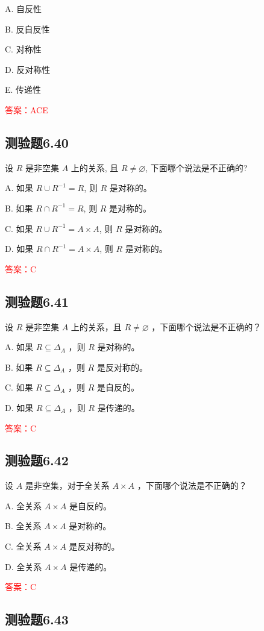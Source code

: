 \documentclass[UTF8, heading=true]{ctexart}
\begin{document}
A. 自反性

B. 反自反性

C. 对称性

D. 反对称性

E. 传递性

\textcolor{red}{答案：ACE}

\subsection{测验题6.40}
设 $R$ 是非空集 $A$ 上的关系, 且 $R \neq \varnothing$, 下面哪个说法是不正确的?

A. 如果 $R \cup R^{-1}=R$, 则 $R$ 是对称的。

B. 如果 $R \cap R^{-1}=R$, 则 $R$ 是对称的。

C. 如果 $R \cup R^{-1}=A \times A$, 则 $R$ 是对称的。

D. 如果 $R \cap R^{-1}=A \times A$, 则 $R$ 是对称的。

\textcolor{red}{答案：C}

\subsection{测验题6.41}

设 $R$ 是非空集 $A$ 上的关系，且 $R \neq \varnothing$ ，下面哪个说法是不正确的？

A. 如果 $R \subseteq \Delta_A$ ，则 $R$ 是对称的。

B. 如果 $R \subseteq \Delta_A$ ，则 $R$ 是反对称的。

C. 如果 $R \subseteq \Delta_A$ ，则 $R$ 是自反的。

D. 如果 $R \subseteq \Delta_A$ ，则 $R$ 是传递的。

\textcolor{red}{答案：C}

\subsection{测验题6.42}

设 $A$ 是非空集，对于全关系 $A \times A$ ，下面哪个说法是不正确的？

A. 全关系 $A \times A$ 是自反的。

B. 全关系 $A \times A$ 是对称的。

C. 全关系 $A \times A$ 是反对称的。

D. 全关系 $A \times A$ 是传递的。

\textcolor{red}{答案：C}


\subsection{测验题6.43}
\end{document}

